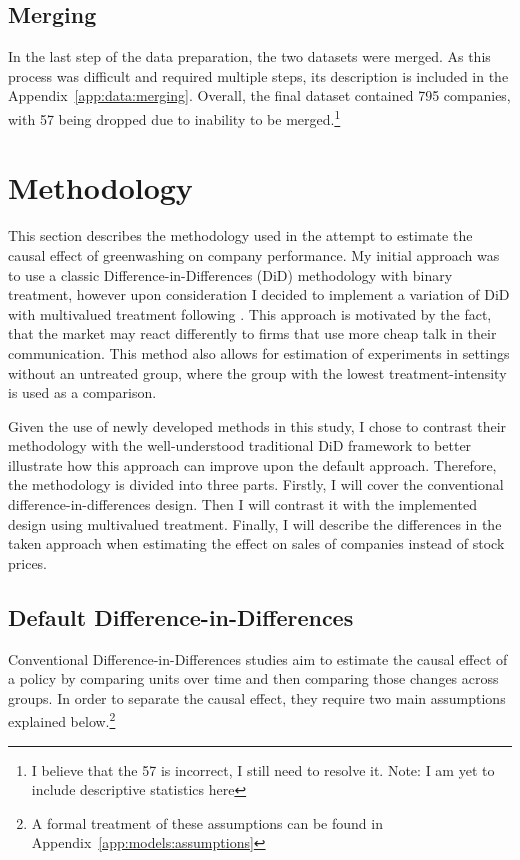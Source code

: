 \documentclass[12pt]{article}
\begin{document}
\subsection{Merging}

In the last step of the data preparation, the two datasets were merged. As this process was difficult and required multiple steps, its description is included in the Appendix~\ref{app:data:merging}. Overall, the final dataset contained 795 companies, with 57 being dropped due to inability to be merged.\footnote{I believe that the 57 is incorrect, I still need to resolve it. Note: I am yet to include descriptive statistics here}


\section{Methodology}\label{sect:methodology}

This section describes the methodology used in the attempt to estimate the causal effect of greenwashing on company performance.
My initial approach was to use a classic Difference-in-Differences (DiD) methodology with binary treatment, however upon consideration I decided to implement a variation of DiD with multivalued treatment following \textcite{callawayDifferenceindifferencesContinuousTreatment2024}. This approach is motivated by the fact, that the market may react differently to firms that use more cheap talk in their communication. This method also allows for estimation of experiments in settings without an untreated group, where the group with the lowest treatment-intensity is used as a comparison. 

Given the use of newly developed methods in this study, I chose to contrast their methodology with the well-understood traditional DiD framework to better illustrate how this approach can improve upon the default approach. Therefore, the methodology is divided into three parts. Firstly, I will cover the conventional difference-in-differences design. Then I will contrast it with the implemented design using multivalued treatment. Finally, I will describe the differences in the taken approach when estimating the effect on sales of companies instead of stock prices.


\subsection{Default Difference-in-Differences}

Conventional Difference-in-Differences studies aim to estimate the causal effect of a policy by comparing units over time and then comparing those changes across groups. In order to separate the causal effect, they require two main assumptions explained below.\footnote{A formal treatment of these assumptions can be found in Appendix~\ref{app:models:assumptions}} 
\end{document}
